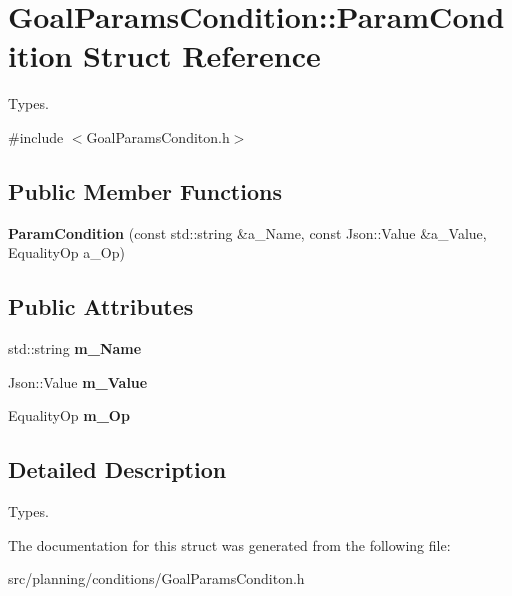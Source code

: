\hypertarget{struct_goal_params_condition_1_1_param_condition}{}\section{Goal\+Params\+Condition\+:\+:Param\+Condition Struct Reference}
\label{struct_goal_params_condition_1_1_param_condition}


Types.  




{\ttfamily \#include $<$Goal\+Params\+Conditon.\+h$>$}

\subsection*{Public Member Functions}
\begin{DoxyCompactItemize}
\item 
\mbox{\label{struct_goal_params_condition_1_1_param_condition_a3539906ec5ff50cf5d2aa8d73f6137b8}} 
{\bfseries Param\+Condition} (const std\+::string \&a\+\_\+\+Name, const Json\+::\+Value \&a\+\_\+\+Value, Equality\+Op a\+\_\+\+Op)
\end{DoxyCompactItemize}
\subsection*{Public Attributes}
\begin{DoxyCompactItemize}
\item 
\mbox{\label{struct_goal_params_condition_1_1_param_condition_aa51899210b919c2ffe108180de5a174b}} 
std\+::string {\bfseries m\+\_\+\+Name}
\item 
\mbox{\label{struct_goal_params_condition_1_1_param_condition_a558cc96f6a7b7b3e1320a9216f7d9bd6}} 
Json\+::\+Value {\bfseries m\+\_\+\+Value}
\item 
\mbox{\label{struct_goal_params_condition_1_1_param_condition_a3bbb86ce558f141f2083608065632ba2}} 
Equality\+Op {\bfseries m\+\_\+\+Op}
\end{DoxyCompactItemize}


\subsection{Detailed Description}
Types. 

The documentation for this struct was generated from the following file\+:\begin{DoxyCompactItemize}
\item 
src/planning/conditions/Goal\+Params\+Conditon.\+h\end{DoxyCompactItemize}
